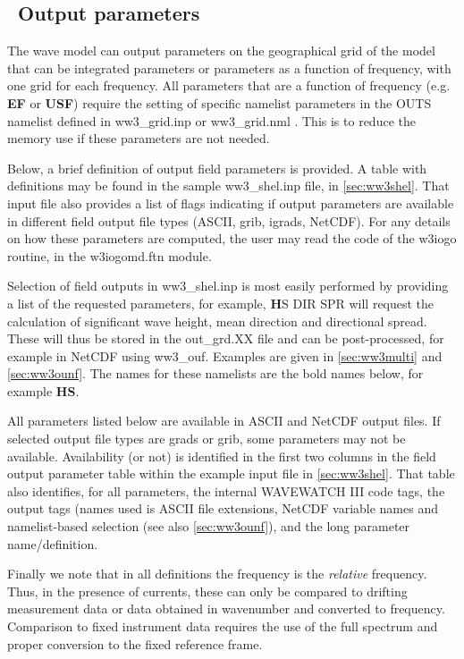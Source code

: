 \vssub
\subsection{~Output parameters} \label{sub:outpars}
\vssub

The wave model can output parameters on the geographical grid of the model that can be integrated parameters or 
parameters as a function of frequency, with one grid for each frequency. All parameters that are a function of frequency (e.g.  \textbf{EF} or \textbf{USF}) require the setting 
of specific namelist parameters in the {\F OUTS} namelist defined in ww3\_grid.inp or  ww3\_grid.nml . This is to reduce the memory use
if these parameters are not needed. 

Below, a brief definition of output field parameters is provided. A table
with definitions may be found in the sample {\code ww3\_shel.inp} file,
in \para\ref{sec:ww3shel}. That input file also provides a list of flags  
indicating if output parameters are available in different field
output file types (ASCII, grib, igrads, NetCDF). 
For any details on how these parameters are computed, the user may read the code of the  {\code w3iogo} routine, in the {\code w3iogomd.ftn} module. 

Selection of field outputs in  {\code ww3\_shel.inp} is most easily performed by providing a list of the 
requested parameters, for example, {\textbf HS DIR SPR}  will request the calculation of significant wave height, mean direction and directional spread. These will thus be stored in the {\code out\_grd.XX} file and can be post-processed, for example in NetCDF using   {\code ww3\_ouf}. Examples are given in \para\ref{sec:ww3multi} and
\para\ref{sec:ww3ounf}. The names for these namelists are the bold names below, for 
example \textbf{HS}. 

All parameters listed below are available in ASCII and NetCDF output files. If selected output file types are grads or grib, some parameters may not be available. Availability (or not) is identified
in the first two columns in the field output parameter table within the example input file in  
\para\ref{sec:ww3shel}. That table also identifies, for all parameters,
the internal WAVEWATCH III code tags, the output tags (names used is ASCII 
file extensions, NetCDF variable names and namelist-based selection (see 
also \para\ref{sec:ww3ounf}), and the long parameter name/definition.

Finally we note that in all definitions the frequency is the \emph{relative} frequency. Thus, in the presence of currents, these can only be compared to drifting measurement data or data obtained in wavenumber and converted to frequency. Comparison to fixed instrument data requires the use of the full spectrum and proper conversion to the fixed reference frame.

